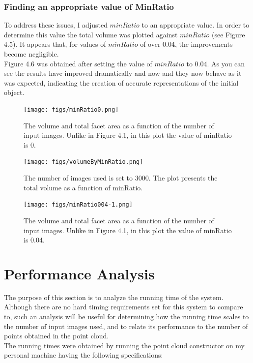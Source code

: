 \documentclass[12pt,a4paper,twoside,openright]{report}
\begin{document}
\subsubsection{Finding an appropriate value of MinRatio}
To address these issues, I adjusted $minRatio$ to an appropriate value. In order to determine this value the total volume was plotted against $minRatio$ (see Figure 4.5). It appears that, for values of $minRatio$ of over 0.04, the improvements become negligible.\\
\linebreak
Figure 4.6 was obtained after setting the value of $minRatio$ to 0.04. As you can see the results have improved dramatically and now and they now behave as it was expected, indicating the creation of accurate representations of the initial object. 

\begin{figure}
\begin{center}
\texttt{[image: figs/minRatio0.png]}	
\caption{The volume and total facet area as a function of the number of input images. Unlike in Figure 4.1, in this plot the value of minRatio is 0.}
\end{center}
\end{figure}


\begin{figure}
\begin{center}
\texttt{[image: figs/volumeByMinRatio.png]}	
\caption{The number of images used is set to 3000. The plot presents the total volume as a function of minRatio.}
\end{center}
\end{figure}

\begin{figure}
\begin{center}
\texttt{[image: figs/minRatio004-1.png]}	
\caption{The volume and total facet area as a function of the number of input images. Unlike in Figure 4.1, in this plot the value of minRatio is 0.04.}
\end{center}
\end{figure}

\section{Performance Analysis}
The purpose of this section is to analyze the running time of the system. Although there are no hard timing requirements set for this system to compare to, such an analysis will be useful for determining how the running time scales to the number of input images used, and to relate its performance to the number of points obtained in the point cloud. \\
\linebreak
The running times were obtained by running the point cloud constructor on my personal machine having the following specifications:\\
\end{document}
